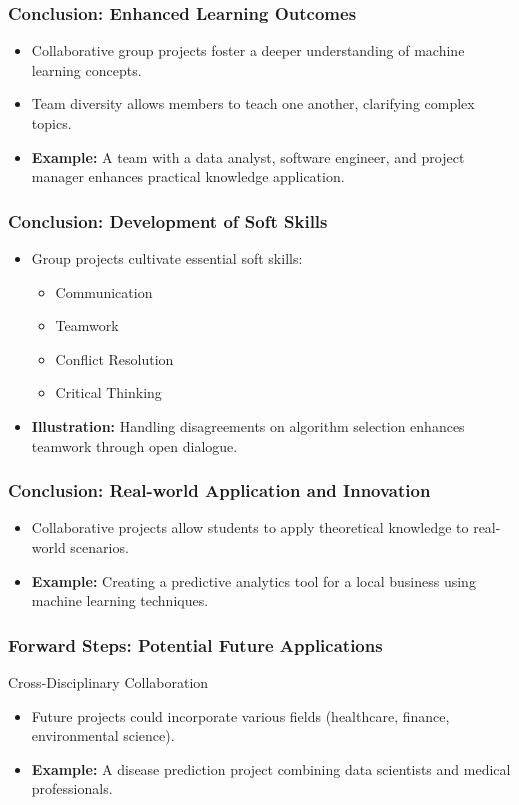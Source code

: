 \documentclass[aspectratio=169]{beamer}
\begin{document}
\begin{frame}[fragile]
    \frametitle{Conclusion: Enhanced Learning Outcomes}
    \begin{itemize}
        \item Collaborative group projects foster a deeper understanding of machine learning concepts.
        \item Team diversity allows members to teach one another, clarifying complex topics.
        \item \textbf{Example:} A team with a data analyst, software engineer, and project manager enhances practical knowledge application.
    \end{itemize}
\end{frame}

\begin{frame}[fragile]
    \frametitle{Conclusion: Development of Soft Skills}
    \begin{itemize}
        \item Group projects cultivate essential soft skills: 
            \begin{itemize}
                \item Communication
                \item Teamwork
                \item Conflict Resolution
                \item Critical Thinking
            \end{itemize}
        \item \textbf{Illustration:} Handling disagreements on algorithm selection enhances teamwork through open dialogue.
    \end{itemize}
\end{frame}

\begin{frame}[fragile]
    \frametitle{Conclusion: Real-world Application and Innovation}
    \begin{itemize}
        \item Collaborative projects allow students to apply theoretical knowledge to real-world scenarios.
        \item \textbf{Example:} Creating a predictive analytics tool for a local business using machine learning techniques.
    \end{itemize}
\end{frame}

\begin{frame}[fragile]
    \frametitle{Forward Steps: Potential Future Applications}
    \begin{block}{Cross-Disciplinary Collaboration}
        \begin{itemize}
            \item Future projects could incorporate various fields (healthcare, finance, environmental science).
            \item \textbf{Example:} A disease prediction project combining data scientists and medical professionals.
        \end{itemize}
    \end{block}
\end{frame}
\end{document}
